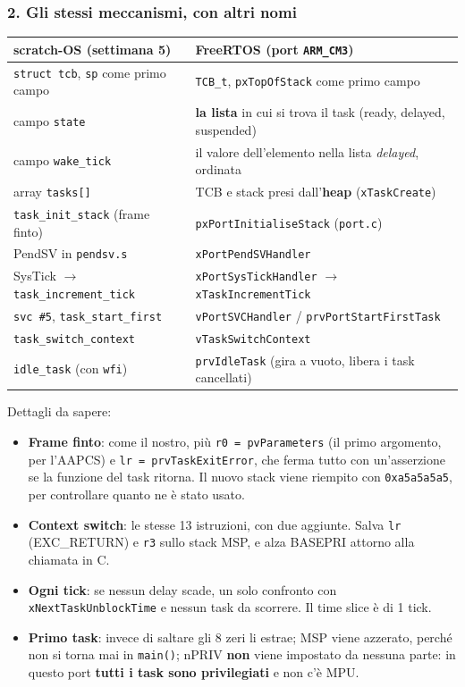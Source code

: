 \subsubsection*{2. Gli stessi meccanismi, con altri nomi}
\begin{center}
\small
\begin{tabular}{P{0.4} P{0.5}}
    \hline
    \textbf{scratch-OS (settimana 5)} & \textbf{FreeRTOS (port \texttt{ARM\_CM3})} \\
    \hline
    \texttt{struct tcb}, \texttt{sp} come primo campo & \texttt{TCB\_t}, \texttt{pxTopOfStack} come primo campo \\
    campo \texttt{state} & \textbf{la lista} in cui si trova il task (ready, delayed, suspended) \\
    campo \texttt{wake\_tick} & il valore dell'elemento nella lista \emph{delayed}, ordinata \\
    array \texttt{tasks[]} & TCB e stack presi dall'\textbf{heap} (\texttt{xTaskCreate}) \\
    \texttt{task\_init\_stack} (frame finto) & \texttt{pxPortInitialiseStack} (\texttt{port.c}) \\
    PendSV in \texttt{pendsv.s} & \texttt{xPortPendSVHandler} \\
    SysTick $\to$ \texttt{task\_increment\_tick} & \texttt{xPortSysTickHandler} $\to$ \texttt{xTaskIncrementTick} \\
    \texttt{svc \#5}, \texttt{task\_start\_first} & \texttt{vPortSVCHandler} / \texttt{prvPortStartFirstTask} \\
    \texttt{task\_switch\_context} & \texttt{vTaskSwitchContext} \\
    \texttt{idle\_task} (con \texttt{wfi}) & \texttt{prvIdleTask} (gira a vuoto, libera i task cancellati) \\
    \hline
\end{tabular}
\end{center}
Dettagli da sapere:
\begin{itemize}
    \item \textbf{Frame finto}: come il nostro, più \texttt{r0 = pvParameters} (il primo argomento, per l'AAPCS) e \texttt{lr = prvTaskExitError}, che ferma tutto con un'asserzione se la funzione del task ritorna. Il nuovo stack viene riempito con \texttt{0xa5a5a5a5}, per controllare quanto ne è stato usato.
    \item \textbf{Context switch}: le stesse 13 istruzioni, con due aggiunte. Salva \texttt{lr} (EXC\_RETURN) e \texttt{r3} sullo stack MSP, e alza BASEPRI attorno alla chiamata in C.
    \item \textbf{Ogni tick}: se nessun delay scade, un solo confronto con \texttt{xNextTaskUnblockTime} e nessun task da scorrere. Il time slice è di 1 tick.
    \item \textbf{Primo task}: invece di saltare gli 8 zeri li estrae; MSP viene azzerato, perché non si torna mai in \texttt{main()}; nPRIV \textbf{non} viene impostato da nessuna parte: in questo port \textbf{tutti i task sono privilegiati} e non c'è MPU.
\end{itemize}

